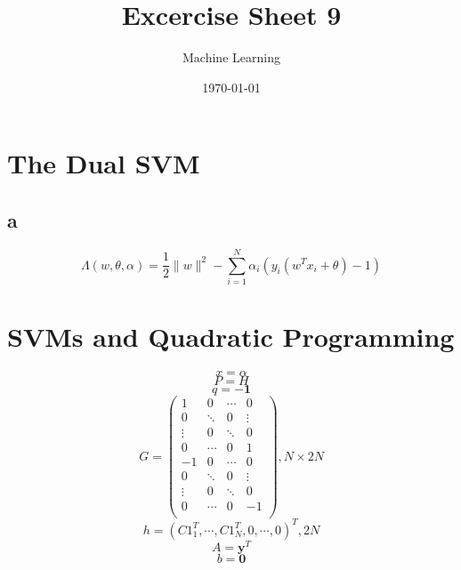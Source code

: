 \documentclass[11pt,abstract=on]{scrartcl}
\title{Excercise Sheet 9}
\subtitle{Machine Learning}
\date{\today}
\begin{document}
\maketitle
\section{The Dual SVM}
\subsection{a}
\begin{equation*}
\Lambda(w,\theta,\alpha) = \frac{1}{2}  \lVert w \rVert^2 - \sum\limits_{i=1}^{N} \alpha_{i}(y_{i}(w^T x_{i} + \theta)-1)
\end{equation*}

\section{SVMs and Quadratic Programming}
\begin{equation*}
x= \alpha
\end{equation*}
\begin{equation*}
P=H
\end{equation*}
\begin{equation*}
q=-\boldsymbol{1}
\end{equation*}
\begin{equation*}
G=\left( \begin{array}{rrrr}
1 & 0 & \cdots & 0 \\
0 & \ddots & 0 & \vdots \\
\vdots & 0 & \ddots & 0 \\
0 & \cdots & 0 & 1 \\
-1 & 0 & \cdots & 0 \\
0 & \ddots & 0 & \vdots \\
\vdots & 0 & \ddots & 0 \\
0 & \cdots & 0 & -1 \\
\end{array}\right), N\times 2N 
\end{equation*}
\begin{equation*}
 h = (C1^T_1,\cdots,C1^T_N,0,\cdots,0)^T,2N
\end{equation*}
\begin{equation*}
A=\boldsymbol{y}^T
\end{equation*}
\begin{equation*}
b = \boldsymbol{0}
\end{equation*}
\end{document}
